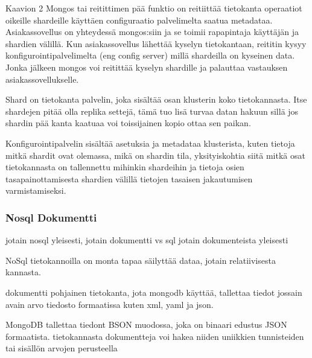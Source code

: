 

Kaavion 2 Mongos tai reitittimen pää funktio on reitiittää tietokanta operaatiot oikeille shardeille käyttäen configuraatio palvelimelta saatua metadataa.
Asiakassovellus on yhteydessä mongos:siin ja se toimii rapapintaja käyttäjän ja shardien välillä. 
%
Kun asiakassovellus lähettää kyselyn tietokantaan, reititin kysyy konfigurointipalvelimelta (eng config server) millä shardeilla on kyseinen data. 
Jonka jälkeen mongos voi reitittää kyselyn shardille ja palauttaa vastauksen asiakassovellukselle.
\medskip

Shard on tietokanta palvelin, joka sisältää osan klusterin koko tietokannasta.
Itse shardejen pitää olla replika settejä, 
tämä tuo lisä turvaa datan hakuun sillä jos shardin pää kanta kaatuaa voi toissijainen kopio ottaa sen paikan. 
\medskip



Konfigurointipalvelin sisältää asetuksia ja metadataa klusterista, 
kuten tietoja mitkä shardit ovat olemassa, mikä on shardin tila,
yksityiskohtia siitä mitkä osat tietokannasta on tallennettu mihinkin shardeihin
ja tietoja osien tasapainottamisesta shardien välillä tietojen tasaisen jakautumisen varmistamiseksi.



\subsubsection{Nosql Dokumentti}



jotain nosql yleisesti, jotain dokumentti vs sql
jotain dokumenteista yleisesti

\medskip

NoSql tietokannoilla on monta tapaa säilyttää dataa, jotain relatiivisesta kannasta. 

dokumentti pohjainen tietokanta, jota mongodb käyttää, tallettaa tiedot jossain avain arvo tiedosto formaatissa kuten xml, yaml ja json. \citemissing
\medskip


MongoDB tallettaa tiedont BSON muodossa, joka on binaari edustus JSON formaatista.
tietokannasta dokumentteja voi hakea niiden uniikkien tunnisteiden tai sisällön arvojen perusteella
\medskip


















